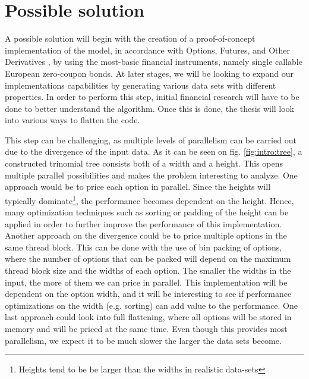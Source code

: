 \section{Possible solution}
\label{section:solution}
A possible solution will begin with the creation of a proof-of-concept implementation of the model, in accordance with Options, Futures, and Other Derivatives \cite{ofod}, by using the most-basic financial instruments, namely single callable European zero-coupon bonds. At later stages, we will be looking to expand our implementations capabilities by generating various data sets with different properties. In order to perform this step, initial financial research will have to be done to better understand the algorithm. Once this is done, the thesis will look into various ways to flatten the code. 

This step can be challenging, as multiple levels of parallelism can be carried out due to the divergence of the input data. As it can be seen on fig. \ref{fig:intro:tree}, a constructed trinomial tree consists both of a width and a height. This opens multiple parallel possibilities and makes the problem interesting to analyze. One approach would be to price each option in parallel. Since the heights will typically dominate\footnote{Heights tend to be be larger than the widths in realistic data-sets}, the performance becomes dependent on the height. Hence, many optimization techniques such as sorting or padding of the height can be applied in order to further improve the performance of this implementation. Another approach on the divergence could be to price multiple options in the same thread block. This can be done with the use of bin packing of options, where the number of options that can be packed will depend on the maximum thread block size and the widths of each option. The smaller the widths in the input, the more of them we can price in parallel. This implementation will be dependent on the option width, and it will be interesting to see if performance optimizations on the width (e.g. sorting) can add value to the performance. One last approach could look into full flattening, where all options will be stored in memory and will be priced at the same time. Even though this provides most parallelism, we expect it to be much slower the larger the data sets become. 

